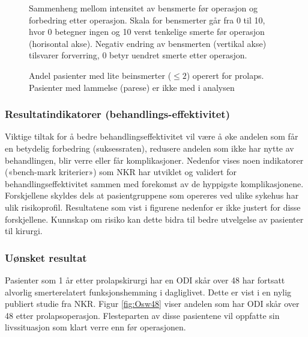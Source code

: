 \begin{figure}[ht]
\caption{\label{fig:BeinsmEndrPre}  Sammenheng mellom intensitet av bensmerte før operasjon og
forbedring etter operasjon. Skala for bensmerter går fra 0 til 10, hvor 0 betegner
ingen og 10 verst tenkelige smerte før operasjon (horisontal akse). Negativ endring
av bensmerten (vertikal akse) tilsvarer forverring, 0 betyr uendret smerte etter
operasjon.}
\end{figure}

\begin{figure}[ht]
\caption{\label{fig:BeinsmLavPre}  Andel pasienter med lite beinsmerter ($\leq 2$) operert for prolaps. Pasienter med lammelse (parese) er ikke med i analysen
}
\end{figure}






\subsubsection{Resultatindikatorer (behandlings-effektivitet)}

Viktige tiltak for å bedre behandlingseffektivitet vil være å øke andelen som får en
betydelig forbedring (suksessraten), redusere andelen som ikke har nytte av
behandlingen, blir verre eller får komplikasjoner. Nedenfor vises noen indikatorer
(«bench-mark kriterier») som NKR har utviklet og validert for
behandlingseffektivitet sammen med forekomst av de hyppigste komplikasjonene.
Forskjellene skyldes dels at pasientgruppene som opereres ved ulike sykehus har
ulik risikoprofil. Resultatene som vist i figurene nedenfor er ikke justert for disse
forskjellene. Kunnskap om risiko kan dette bidra til bedre utvelgelse av pasienter til
kirurgi.





\subsubsection{Uønsket resultat}

Pasienter som 1 år etter prolapskirurgi har en ODI skår over 48 har fortsatt alvorlig
smerterelatert funksjonshemming i dagliglivet. Dette er vist i en nylig publiert studie fra NKR. Figur \ref{fig:Osw48} viser andelen som har ODI skår over 48 etter prolapsoperasjon. Flesteparten av disse pasientene vil
oppfatte sin livssituasjon som klart verre enn før operasjonen. 


